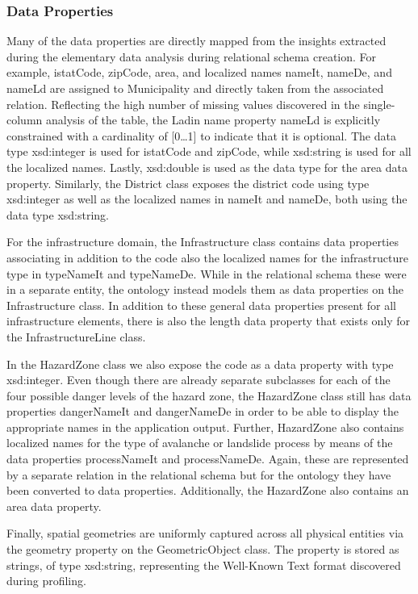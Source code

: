 \subsubsection{Data Properties}

Many of the data properties are directly mapped from the insights extracted during the elementary data analysis during relational schema creation. For example, istatCode, zipCode, area, and localized names nameIt, nameDe, and nameLd are assigned to Municipality and directly taken from the associated relation. Reflecting the high number of missing values discovered in the single-column analysis of the  table, the Ladin name property nameLd is explicitly constrained with a cardinality of [0\dots1] to indicate that it is optional. The data type xsd:integer is used for istatCode and zipCode, while xsd:string is used for all the localized names. Lastly, xsd:double is used as the data type for the area data property.
Similarly, the District class exposes the district code using type xsd:integer as well as the localized names in nameIt and nameDe, both using the data type xsd:string. 

For the infrastructure domain, the Infrastructure class contains data properties associating in addition to the code also the localized names for the infrastructure type in typeNameIt and typeNameDe. While in the relational schema these were in a separate entity, the ontology instead models them as data properties on the Infrastructure class.
In addition to these general data properties present for all infrastructure elements, there is also the length data property that exists only for the InfrastructureLine class.

In the HazardZone class we also expose the code as a data property with type xsd:integer. Even though there are already separate subclasses for each of the four possible danger levels of the hazard zone, the HazardZone class still has data properties dangerNameIt and dangerNameDe in order to be able to display the appropriate names in the application output. Further, HazardZone also contains localized names for the type of avalanche or landslide process by means of the data properties processNameIt and processNameDe. Again, these are represented by a separate relation in the relational schema but for the ontology they have been converted to data properties. Additionally, the HazardZone also contains an area data property.

Finally, spatial geometries are uniformly captured across all physical entities via the geometry property on the GeometricObject class. The property is stored as strings, of type xsd:string, representing the Well-Known Text format discovered during profiling.

